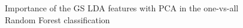 \documentclass[twoside]{article}
\begin{document}
\begin{multicols}{2}
\begin{figure}[H]
\centering
{}
\quad
{}
\quad
{}
%
\caption{Importance of the GS LDA features with PCA in the one-vs-all Random Forest classification}
\label{fig:figure}
\end{figure}



\end{multicols}
\end{document}

